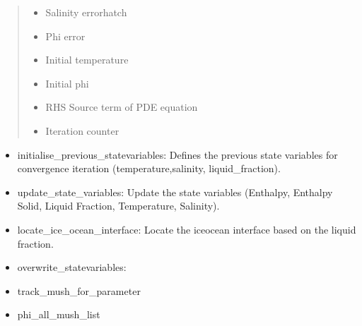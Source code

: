 \documentclass[a4paper,11pt,english,openany]{sphinxmanual}
\begin{document}
\begin{fulllineitems}
\begin{fulllineitems}
\begin{quote}
\begin{description}
\begin{itemize}
\item {} 
\sphinxAtStartPar
{} \textendash{} Salinity errorhatch

\item {} 
\sphinxAtStartPar
{} \textendash{} Phi error

\item {} 
\sphinxAtStartPar
{} \textendash{} Initial temperature

\item {} 
\sphinxAtStartPar
{} \textendash{} Initial phi

\item {} 
\sphinxAtStartPar
{} \textendash{} RHS Source term of PDE equation

\item {} 
\sphinxAtStartPar
{} \textendash{} Iteration counter

\end{itemize}

\end{description}\end{quote}
\begin{description}
\begin{itemize}
\item {} 
\sphinxAtStartPar
initialise\_previous\_statevariables: Defines the previous state variables for convergence iteration (temperature,salinity, liquid\_fraction).

\item {} 
\sphinxAtStartPar
update\_state\_variables: Update the state variables (Enthalpy, Enthalpy Solid, Liquid Fraction, Temperature, Salinity).

\item {} 
\sphinxAtStartPar
locate\_ice\_ocean\_interface: Locate the ice\sphinxhyphen{}ocean interface based on the liquid fraction.

\item {} 
\sphinxAtStartPar
overwrite\_statevariables:

\item {} 
\sphinxAtStartPar
track\_mush\_for\_parameter

\item {} 
\sphinxAtStartPar
phi\_all\_mush\_list


\end{itemize}
\end{description}
\end{fulllineitems}
\end{fulllineitems}
\end{document}
